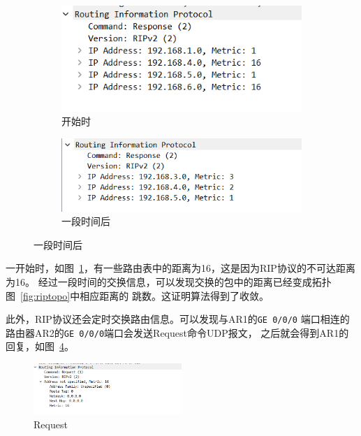 \documentclass[a4paper,twoside]{article}
\begin{document}
\begin{spacing}{1.2}
\begin{figure}[htbp]
	\centering
	\caption{RIP协议收敛过程}
	\label{fig:ar1rip}
	\begin{subfigure}{0.4\textwidth}
		\centering
		\includegraphics[width=\textwidth]{before.png}
		\caption{开始时}
		\label{fig:ar1before}
	\end{subfigure}
	\begin{subfigure}{0.4\textwidth}
		\centering
		\includegraphics[width=\textwidth]{after.png}
		\caption{一段时间后}
		\label{fig:ar1after}
	\end{subfigure}
\end{figure}

一开始时，如图~\ref{fig:ar1before}，有一些路由表中的距离为16，这是因为RIP协议的不可达距离为16。
经过一段时间的交换信息，可以发现交换的包中的距离已经变成拓扑图~\ref{fig:riptopo}中相应距离的
跳数。这证明算法得到了收敛。

此外，RIP协议还会定时交换路由信息。可以发现与AR1的\texttt{GE 0/0/0}
端口相连的路由器AR2的\texttt{GE 0/0/0}端口会发送Request命令UDP报文，
之后就会得到AR1的回复，如图~\ref{fig:ar2req}。
\begin{figure}[htb]
	\centering
	\caption{Request}
	\label{fig:ar2req}
	\includegraphics[width=0.5\textwidth]{request.png}
\end{figure}


\end{spacing}
\end{document}
